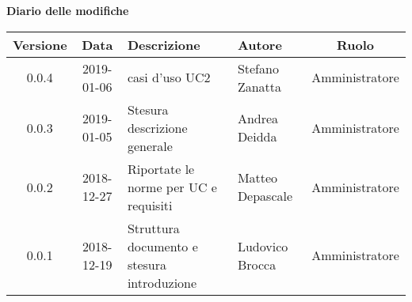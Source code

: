 	\begin{center}
		\textbf{Diario delle modifiche}
	\end{center}
	\begin{center}
		\begin{tabularx}{\textwidth}{|c|c|X|X|c|}
			\hline
			\textbf{Versione} & \textbf{Data} & \textbf{Descrizione} & \textbf{Autore} & \textbf{Ruolo} \\
			\hline
			0.0.4 & 2019-01-06 & casi d'uso UC2& Stefano Zanatta & Amministratore\\
			\hline
			0.0.3 & 2019-01-05 & Stesura descrizione generale& Andrea Deidda & Amministratore\\
			\hline
			0.0.2 & 2018-12-27 & Riportate le norme per UC e requisiti& Matteo Depascale & Amministratore\\
			\hline
			0.0.1 & 2018-12-19 & Struttura documento e stesura introduzione& Ludovico Brocca & Amministratore\\
			\hline
		\end{tabularx}
	\end{center}
\newpage